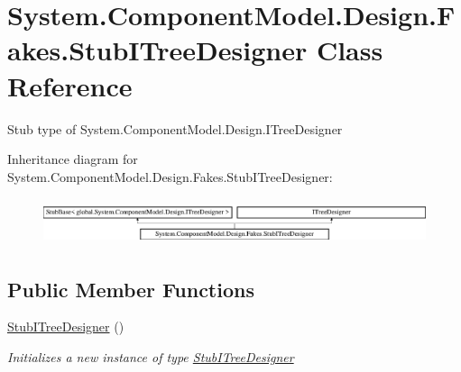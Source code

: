 \hypertarget{class_system_1_1_component_model_1_1_design_1_1_fakes_1_1_stub_i_tree_designer}{\section{System.\-Component\-Model.\-Design.\-Fakes.\-Stub\-I\-Tree\-Designer Class Reference}
\label{class_system_1_1_component_model_1_1_design_1_1_fakes_1_1_stub_i_tree_designer}
}


Stub type of System.\-Component\-Model.\-Design.\-I\-Tree\-Designer 


Inheritance diagram for System.\-Component\-Model.\-Design.\-Fakes.\-Stub\-I\-Tree\-Designer\-:\begin{figure}[H]
\begin{center}
\leavevmode
\includegraphics[height=1.386139cm]{class_system_1_1_component_model_1_1_design_1_1_fakes_1_1_stub_i_tree_designer}
\end{center}
\end{figure}
\subsection*{Public Member Functions}
\begin{DoxyCompactItemize}
\item 
\hyperlink{class_system_1_1_component_model_1_1_design_1_1_fakes_1_1_stub_i_tree_designer_a49ed530903d90f7c174c718c49c9ed22}{Stub\-I\-Tree\-Designer} ()
\begin{DoxyCompactList}\small\item\em Initializes a new instance of type \hyperlink{class_system_1_1_component_model_1_1_design_1_1_fakes_1_1_stub_i_tree_designer}{Stub\-I\-Tree\-Designer}\end{DoxyCompactList}\end{DoxyCompactItemize}
